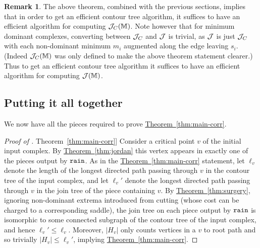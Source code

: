 \documentclass[11pt]{article}
\theoremstyle{definition}
\newtheorem{Remark}[theorem]{Remark}
\newcommand{\cJ}{{\cal J}}
\newcommand{\MM}{\mathbb{M}}
\newcommand{\Thm}[1]{\hyperref[thm:#1]{Theorem~\ref*{thm:#1}}} %
\newcommand{\jc}{\cJ_C}
\newcommand{\rain}{{\tt rain}}
\begin{document}
\begin{Remark}\label{rem:joinAndCriticalJoin}
The above theorem, combined with the previous sections, implies that in order to get an efficient contour tree algorithm, 
it suffices to have an efficient algorithm for computing $\jc(\MM)$.
Note however that for minimum dominant complexes, converting between $\jc$ and $\cJ$ is trivial, 
as $\cJ$ is just $\jc$ with each non-dominant minimum $m_i$ augmented along the edge leaving $s_i$. 
(Indeed $\jc(\MM)$ was only defined to make the above theorem statement clearer.)  
Thus to get an efficient contour tree algorithm it suffices to have an efficient algorithm for computing $\cJ(\MM)$.
\end{Remark}

\subsection{Putting it all together}
We now have all the pieces required to prove \Thm{main-corr}.
\begin{proof}[Proof of \Thm{main-corr}]
Consider a critical point $v$ of the initial input 
complex.  By \Thm{jordan} this vertex appears in exactly one of the pieces output by $\rain$.  As in the \Thm{main-corr} statement, let $\ell_v$ 
denote the length of the longest directed path passing through $v$ in the contour tree of the input complex, and let $\ell_v'$ 
denote the longest directed path passing through $v$ in the join tree of the piece containing $v$.
By \Thm{surgery}, ignoring non-dominant extrema introduced from cutting (whose cost can be charged to a corresponding saddle), the join tree on each piece output by $\rain$ is isomorphic to some 
connected subgraph of the contour tree of the input complex, and hence $\ell_v'\leq \ell_v$.  
Moreover, $|H_v|$ only counts vertices in a $v$ to root path and so trivially $|H_v|\leq \ell_v'$, implying \Thm{main-corr}.
\end{proof}
\end{document}

